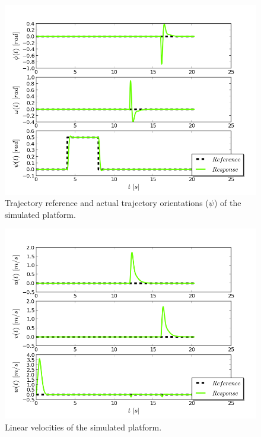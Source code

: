 \begin{figure}[H]
\centering
\includegraphics[scale=0.7]{Images/Chapter5/ardrone/euler_angle_control.png}
\caption{Trajectory reference and actual trajectory orientations ($\psi$) of the simulated platform.}
\label{fig:ardrone_ang}
\end{figure}

\begin{figure}[H]
\centering
\includegraphics[scale=0.7]{Images/Chapter5/ardrone/lin_velocity_control.png}
\caption{Linear velocities of the simulated platform. }
\label{fig:ardrone_lin_vel}
\end{figure}

